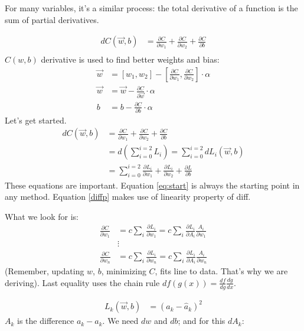 For many variables, it's a similar process: the total derivative of a function is the sum of partial derivatives.

\begin{align}
  dC(\vec{w},b) &= \frac{\partial C}{\partial w_1}+ \frac{\partial C}{\partial w_2} + \frac{\partial C}{\partial b}\\
\end{align}
$C(w,b)$ derivative is used to find better weights and bias:
\begin{align*}
  \vec{w} &= [w_1, w_2] - [\frac{\partial C}{\partial w_1},\frac{\partial C}{\partial w_2}]\cdot{}\alpha\\
  \vec{w} &= \vec{w} -\frac{\partial C}{\partial \vec{w}}\cdot{}\alpha\\
  b &= b -\frac{\partial C}{\partial b}\cdot{}\alpha
\end{align*}
Let's get started.
\begin{align}
  dC(\vec{w},b) &= \frac{\partial C}{\partial w_1}+ \frac{\partial C}{\partial w_2} + \frac{\partial C}{\partial b}\label{eq:start}\\
  &= d(\sum_{i=0}^{i=2}L_i) = \sum_{i=0}^{i=2}dL_i(\vec{w},b) \label{diffp}\\
  &=\sum_{i=0}^{i=2} \frac{\partial L_i}{\partial w_1} +\frac{\partial L_i}{\partial w_2} + \frac{\partial L}{\partial b}\nonumber
\end{align} 
These equations are important. Equation \ref{eq:start} is always the starting point in any method. Equation \ref{diffp} makes use of linearity property of diff.

What we look for is:
\begin{align}
  \frac{\partial C}{\partial w_1} &= c\sum_i \frac{\partial L_i}{\partial w_1} = c\sum_i \frac{\partial L_i}{\partial A_i}\frac{A_i}{\partial w_1}\nonumber\\
  &\vdots\nonumber\\
  \frac{\partial C}{\partial w_n} &= c\sum_i \frac{\partial L_i}{\partial w_n}  = c\sum_i \frac{\partial L_i}{\partial A_i}\frac{A_i}{\partial w_n} \label{eq:cost_vector} 
\end{align}
(Remember, updating $w$, $b$, minimizing $C$, fits line to data. That's why we are deriving). Last equality uses the chain rule $df(g(x)) = \frac{df}{dg}\frac{dg}{dx}$. 

\begin{align*}
  L_k(\vec{w},b) &= (a_k - \hat{a}_k)^2
\end{align*}
$A_k$ is the difference $a_k-\hat{a}_k$. We need $dw$ and $db$; and for this $dA_k$:

